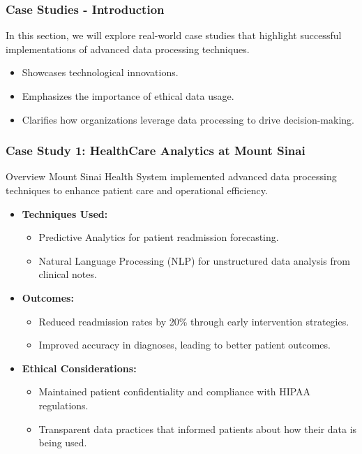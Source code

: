 \documentclass[aspectratio=169]{beamer}
\begin{document}
\begin{frame}[fragile]
    \frametitle{Case Studies - Introduction}
    In this section, we will explore real-world case studies that highlight successful implementations of advanced data processing techniques. 
    \begin{itemize}
        \item Showcases technological innovations.
        \item Emphasizes the importance of ethical data usage.
        \item Clarifies how organizations leverage data processing to drive decision-making.
    \end{itemize}
\end{frame}

\begin{frame}[fragile]
    \frametitle{Case Study 1: HealthCare Analytics at Mount Sinai}
    \begin{block}{Overview}
        Mount Sinai Health System implemented advanced data processing techniques to enhance patient care and operational efficiency. 
    \end{block}
    
    \begin{itemize}
        \item \textbf{Techniques Used:}
            \begin{itemize}
                \item Predictive Analytics for patient readmission forecasting.
                \item Natural Language Processing (NLP) for unstructured data analysis from clinical notes.
            \end{itemize}
        \item \textbf{Outcomes:}
            \begin{itemize}
                \item Reduced readmission rates by 20\% through early intervention strategies.
                \item Improved accuracy in diagnoses, leading to better patient outcomes.
            \end{itemize}
        \item \textbf{Ethical Considerations:}
            \begin{itemize}
                \item Maintained patient confidentiality and compliance with HIPAA regulations.
                \item Transparent data practices that informed patients about how their data is being used.
            \end{itemize}
    \end{itemize}
\end{frame}
\end{document}

